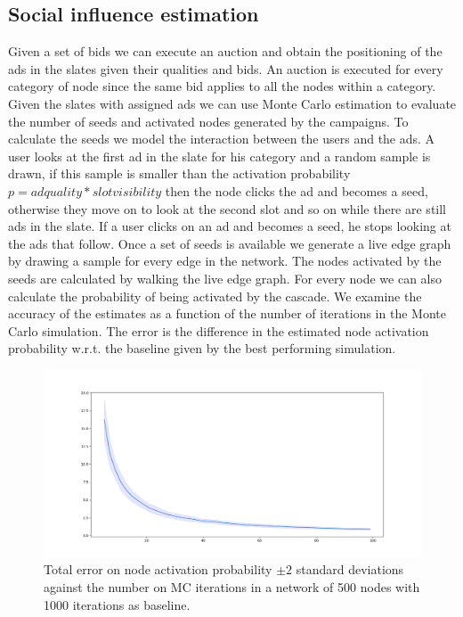 \documentclass{article}
\begin{document}
\subsection{Social influence estimation}
Given a set of bids we can execute an auction and obtain the positioning of the ads in the slates given their qualities and bids. An auction is executed for every category of node since the same bid applies to all the nodes within a category. Given the slates with assigned ads we can use Monte Carlo estimation to evaluate the number of seeds and activated nodes generated by the campaigns. To calculate the seeds we model the interaction between the users and the ads. A user looks at the first ad in the slate for his category and a random sample is drawn, if this sample is smaller than the activation probability $p = ad  quality * slot  visibility$ then the node clicks the ad and becomes a seed, otherwise they move on to look at the second slot and so on while there are still ads in the slate. If a user clicks on an ad and becomes a seed, he stops looking at the ads that follow. Once a set of seeds is available we generate a live edge graph by drawing a sample for every edge in the network. The nodes activated by the seeds are calculated by walking the live edge graph. For every node we can also calculate the probability of being activated by the cascade. We examine the accuracy of the estimates as a function of the number of iterations in the Monte Carlo simulation. The error is the difference in the estimated node activation probability w.r.t. the baseline given by the best performing simulation.

\begin{figure}[H]
    \centering
    \includegraphics[width = \textwidth]{images/500 nodes step 2 50 tests each.png}
    \caption{Total error on node activation probability $\pm 2$ standard deviations against the number on MC iterations in a network of 500 nodes with 1000 iterations as baseline.}
\end{figure}
\end{document}
